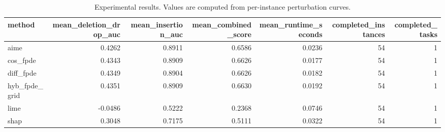 \begin{table}[t]
\caption{Experimental results. Values are computed from per-instance perturbation curves.}
\label{tab:main_results_computed}
\centering
\begin{tabular}{lrrrrrr}
\toprule
method & mean\_deletion\_drop\_auc & mean\_insertion\_auc & mean\_combined\_score & mean\_runtime\_seconds & completed\_instances & completed\_tasks \\
\midrule
aime & 0.4262 & 0.8911 & 0.6586 & 0.0236 & 54 & 1 \\
cos\_fpde & 0.4343 & 0.8909 & 0.6626 & 0.0177 & 54 & 1 \\
diff\_fpde & 0.4349 & 0.8904 & 0.6626 & 0.0182 & 54 & 1 \\
hyb\_fpde\_grid & 0.4351 & 0.8909 & 0.6630 & 0.0192 & 54 & 1 \\
lime & -0.0486 & 0.5222 & 0.2368 & 0.0746 & 54 & 1 \\
shap & 0.3048 & 0.7175 & 0.5111 & 0.0322 & 54 & 1 \\
\bottomrule
\end{tabular}

\end{table}
